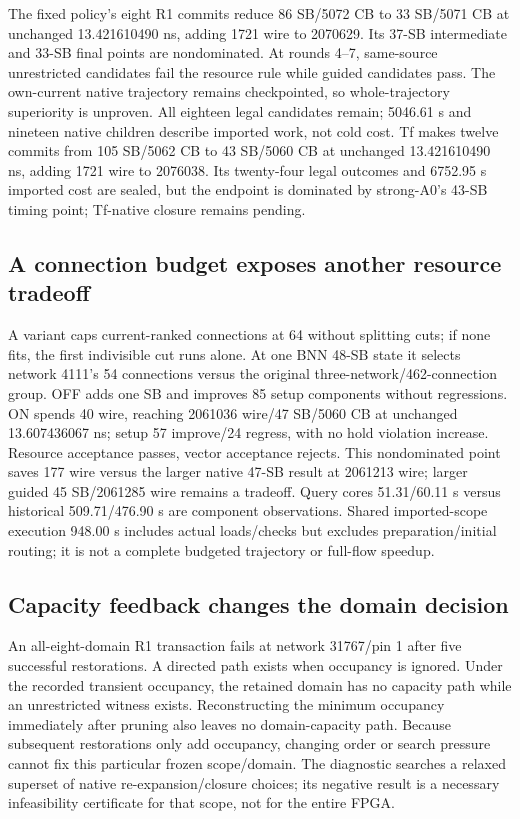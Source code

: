 \documentclass[conference,10pt]{IEEEtran}
\begin{document}
The fixed policy's eight R1 commits reduce 86 SB/5072 CB to 33 SB/5071 CB at unchanged 13.421610490 ns, adding 1721 wire to 2070629. Its 37-SB intermediate and 33-SB final points are nondominated. At rounds 4--7, same-source unrestricted candidates fail the resource rule while guided candidates pass. The own-current native trajectory remains checkpointed, so whole-trajectory superiority is unproven. All eighteen legal candidates remain; 5046.61 s and nineteen native children describe imported work, not cold cost. Tf makes twelve commits from 105 SB/5062 CB to 43 SB/5060 CB at unchanged 13.421610490 ns, adding 1721 wire to 2076038. Its twenty-four legal outcomes and 6752.95 s imported cost are sealed, but the endpoint is dominated by strong-A0's 43-SB timing point; Tf-native closure remains pending.

\subsection{A connection budget exposes another resource tradeoff}
A variant caps current-ranked connections at 64 without splitting cuts; if none fits, the first indivisible cut runs alone. At one BNN 48-SB state it selects network 4111's 54 connections versus the original three-network/462-connection group. OFF adds one SB and improves 85 setup components without regressions. ON spends 40 wire, reaching 2061036 wire/47 SB/5060 CB at unchanged 13.607436067 ns; setup 57 improve/24 regress, with no hold violation increase. Resource acceptance passes, vector acceptance rejects. This nondominated point saves 177 wire versus the larger native 47-SB result at 2061213 wire; larger guided 45 SB/2061285 wire remains a tradeoff. Query cores 51.31/60.11 s versus historical 509.71/476.90 s are component observations. Shared imported-scope execution 948.00 s includes actual loads/checks but excludes preparation/initial routing; it is not a complete budgeted trajectory or full-flow speedup.

\subsection{Capacity feedback changes the domain decision}
An all-eight-domain R1 transaction fails at network 31767/pin 1 after five successful restorations. A directed path exists when occupancy is ignored. Under the recorded transient occupancy, the retained domain has no capacity path while an unrestricted witness exists. Reconstructing the minimum occupancy immediately after pruning also leaves no domain-capacity path. Because subsequent restorations only add occupancy, changing order or search pressure cannot fix this particular frozen scope/domain. The diagnostic searches a relaxed superset of native re-expansion/closure choices; its negative result is a necessary infeasibility certificate for that scope, not for the entire FPGA.
\end{document}
